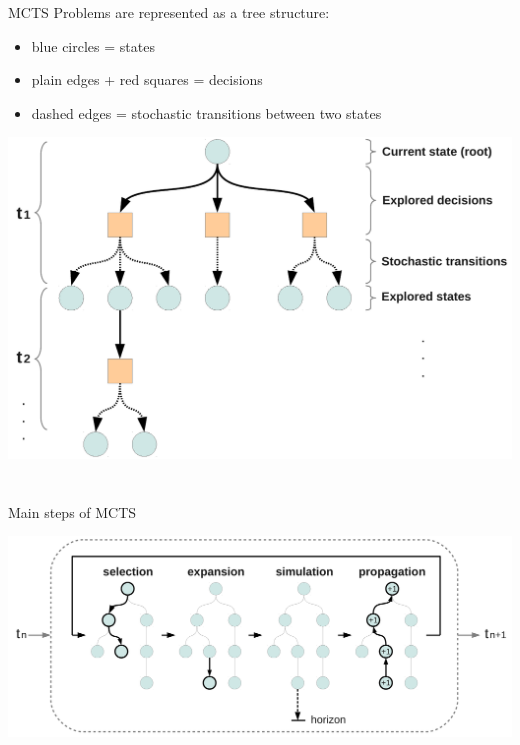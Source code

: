 \begin{frame}{MCTS}
    Problems are represented as a tree structure:
    \begin{itemize}
        \item blue circles = states
        \item plain edges + red squares = decisions
        \item dashed edges = stochastic transitions between two states
    \end{itemize}
    \begin{center}
        \includegraphics[width=.65\linewidth]{fig/tree}
    \end{center}
\end{frame}


\section{\mcts{}}
\subsection{\mcts}

\begin{frame}{Main steps of MCTS}
    \begin{center}
        \includegraphics[width=.99\linewidth]{fig/tree9}
    \end{center}
\end{frame}



